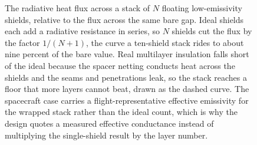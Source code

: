 \begin{figure}[htbp]
\centering
{}
\caption[Multilayer-insulation effective conductance against shield
count]{The radiative heat flux across a stack of $N$ floating
low-emissivity shields, relative to the flux across the same bare gap.
Ideal shields each add a radiative resistance in series, so $N$ shields
cut the flux by the factor $1/(N+1)$, the curve a ten-shield stack rides
to about nine percent of the bare value. Real multilayer insulation
falls short of the ideal because the spacer netting conducts heat across
the shields and the seams and penetrations leak, so the stack reaches a
floor that more layers cannot beat, drawn as the dashed curve. The
spacecraft case carries a flight-representative effective emissivity for
the wrapped stack rather than the ideal count, which is why the design
quotes a measured effective conductance instead of multiplying the
single-shield result by the layer number.}
\label{fig:vol04ch05:mli-layers}
\end{figure}
